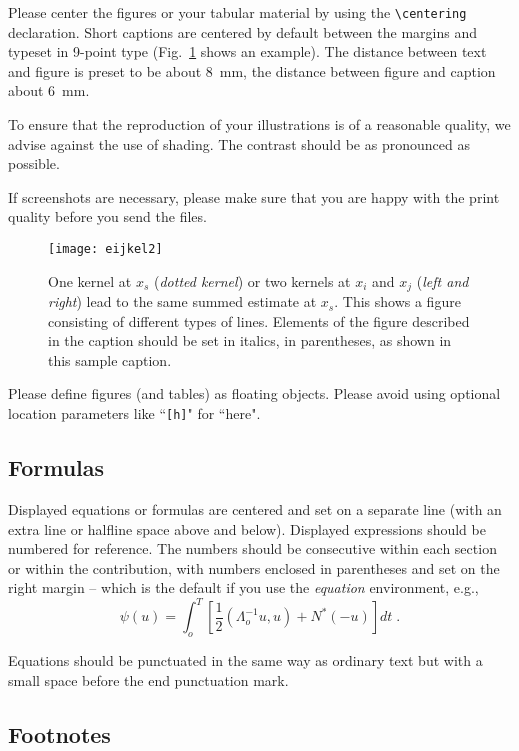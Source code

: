 \documentclass[runningheads,a4paper]{llncs}
\begin{document}
Please center the figures or your tabular material by using the \verb+\centering+
declaration. Short captions are centered by default between the margins
and typeset in 9-point type (Fig.~\ref{fig:example} shows an example).
The distance between text and figure is preset to be about 8~mm, the
distance between figure and caption about 6~mm.

To ensure that the reproduction of your illustrations is of a reasonable
quality, we advise against the use of shading. The contrast should be as
pronounced as possible.

If screenshots are necessary, please make sure that you are happy with
the print quality before you send the files.
\begin{figure}
\centering
\texttt{[image: eijkel2]}
\caption{One kernel at $x_s$ (\emph{dotted kernel}) or two kernels at
$x_i$ and $x_j$ (\textit{left and right}) lead to the same summed estimate
at $x_s$. This shows a figure consisting of different types of
lines. Elements of the figure described in the caption should be set in
italics, in parentheses, as shown in this sample caption.}
\label{fig:example}
\end{figure}

Please define figures (and tables) as floating objects. Please avoid
using optional location parameters like ``\verb+[h]+" for ``here".

\subsection{Formulas}

Displayed equations or formulas are centered and set on a separate
line (with an extra line or halfline space above and below). Displayed
expressions should be numbered for reference. The numbers should be
consecutive within each section or within the contribution,
with numbers enclosed in parentheses and set on the right margin --
which is the default if you use the \emph{equation} environment, e.g.,
\begin{equation}
  \psi (u) = \int_{o}^{T} \left[\frac{1}{2}
  \left(\Lambda_{o}^{-1} u,u\right) + N^{\ast} (-u)\right] dt \;  .
\end{equation}

Equations should be punctuated in the same way as ordinary
text but with a small space before the end punctuation mark.

\subsection{Footnotes}
\end{document}
